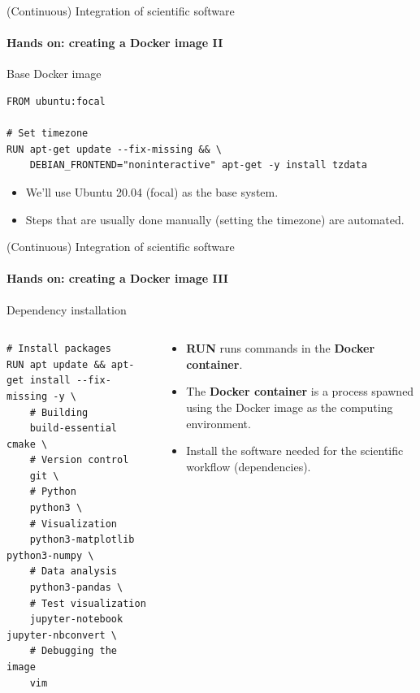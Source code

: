 \begin{frame}[fragile]{(Continuous) Integration of scientific software} 
    \framesubtitle{Hands on: creating a Docker image II} 
    \vfill

    Base Docker image

    \begin{verbatim}
FROM ubuntu:focal 

# Set timezone
RUN apt-get update --fix-missing && \
    DEBIAN_FRONTEND="noninteractive" apt-get -y install tzdata
    \end{verbatim}

    \begin{itemize}
        \item We'll use Ubuntu 20.04 (focal) as the base system.
        \item Steps that are usually done manually (setting the timezone) are automated. 
    \end{itemize}

\end{frame}

\begin{frame}[fragile]{(Continuous) Integration of scientific software} 
    \framesubtitle{Hands on: creating a Docker image III} 
    \vfill

    Dependency installation 

    \begin{columns}
        \begin{column}[c]{0.5\textwidth}
    \begin{verbatim}
# Install packages
RUN apt update && apt-get install --fix-missing -y \
    # Building
    build-essential cmake \
    # Version control
    git \
    # Python
    python3 \ 
    # Visualization
    python3-matplotlib python3-numpy \
    # Data analysis
    python3-pandas \
    # Test visualization
    jupyter-notebook jupyter-nbconvert \
    # Debugging the image 
    vim  
    \end{verbatim}
        \end{column}
        \begin{column}[c]{0.5\textwidth}
            \begin{itemize}
                \item \textbf{RUN} runs commands in the \textbf{Docker container}. 
                \item The \textbf{Docker container} is a process spawned using the Docker image as the computing environment.
                \item Install the software needed for the scientific workflow (dependencies).
            \end{itemize}
        \end{column}
    \end{columns}


\end{frame}

